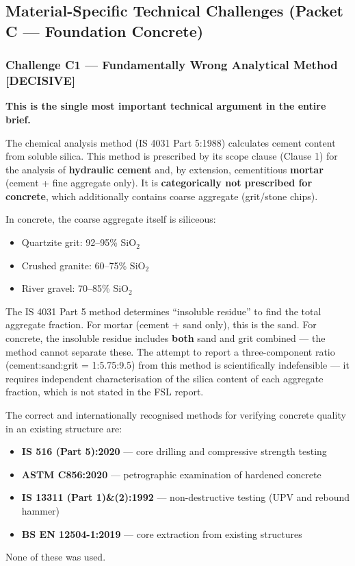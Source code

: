 \documentclass[12pt, a4paper]{article}
\begin{document}
\subsection{Material-Specific Technical Challenges (Packet C --- Foundation Concrete)}

\subsubsection{Challenge C1 --- Fundamentally Wrong Analytical Method \textbf{[DECISIVE]}}

\begin{criticalbox}
\textbf{This is the single most important technical argument in the entire brief.}

The chemical analysis method (IS 4031 Part 5:1988) calculates cement content from soluble silica. This method is prescribed by its scope clause (Clause 1) for the analysis of \textbf{hydraulic cement} and, by extension, cementitious \textbf{mortar} (cement + fine aggregate only). It is \textbf{categorically not prescribed for concrete}, which additionally contains coarse aggregate (grit/stone chips).

In concrete, the coarse aggregate itself is siliceous:
\begin{itemize}
  \item Quartzite grit: 92--95\% SiO$_2$
  \item Crushed granite: 60--75\% SiO$_2$
  \item River gravel: 70--85\% SiO$_2$
\end{itemize}

The IS 4031 Part 5 method determines ``insoluble residue'' to find the total aggregate fraction. For mortar (cement + sand only), this is the sand. For concrete, the insoluble residue includes \textbf{both} sand and grit combined --- the method cannot separate these. The attempt to report a three-component ratio (cement:sand:grit = 1:5.75:9.5) from this method is scientifically indefensible --- it requires independent characterisation of the silica content of each aggregate fraction, which is not stated in the FSL report.

The correct and internationally recognised methods for verifying concrete quality in an existing structure are:
\begin{itemize}
  \item \textbf{IS 516 (Part 5):2020} --- core drilling and compressive strength testing
  \item \textbf{ASTM C856:2020} --- petrographic examination of hardened concrete
  \item \textbf{IS 13311 (Part 1)\&(2):1992} --- non-destructive testing (UPV and rebound hammer)
  \item \textbf{BS EN 12504-1:2019} --- core extraction from existing structures
\end{itemize}

None of these was used.
\end{criticalbox}
\end{document}
